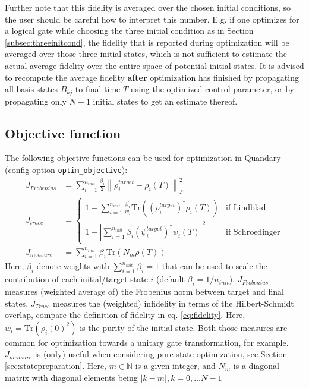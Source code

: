 \documentclass[11pt]{article}
\newcommand{\N}{\mathds{N}}
\begin{document}
Further note that this fidelity is averaged over the chosen initial conditions, so the user should be careful how to interpret this number. E.g. if one optimizes for a logical gate while choosing the three initial condition as in Section \ref{subsec:threeinitcond}, the fidelity that is reported during optimization will be averaged over those three initial states, which is not sufficient to estimate the actual average fidelity over the entire space of potential initial states. It is advised to recompute the average fidelity \textbf{after} optimization has finished by propagating all basis states $B_{kj}$ to final time $T$ using the optimized control parameter, or by propagating only $N+1$ initial states to get an estimate thereof.


\subsection{Objective function}\label{sec:objectivefunctionals}
The following objective functions can be used for optimization in Quandary (config option \texttt{optim\_objective}):
\begin{align}
 J_{Frobenius} &= \sum_{i=1}^{n_{init}} \frac{\beta_i}{2} \left\| \rho^{target}_i - \rho_i(T)\right\|^2_F \\ 
 J_{trace} &= 
\begin{cases} 
 1 - \sum_{i=1}^{n_{init}} \frac{\beta_i}{w_i} \mbox{Tr}\left((\rho^{target}_i)^\dagger\rho_i(T)\right) & \text{if Lindblad}\\
 1 - \left|\sum_{i=1}^{n_{init}} \beta_i (\psi^{target}_i)^\dagger\psi_i(T)\right|^2 & \text{if Schroedinger}
\end{cases}\\
 J_{measure} &= \sum_{i=1}^{n_{init}} \beta_i \mbox{Tr} \left( N_m \rho(T) \right) \label{eq:Jmeasure} 
\end{align}
Here, $\beta_i$ denote weights with $\sum_{i=1}^{n_{init}} \beta _i = 1$ that can be used to scale the contribution of each initial/target state $i$ (default $\beta_i = 1/n_{init}$). 
$J_{Frobenius}$ measures (weighted average of) the Frobenius norm between target and final states. $J_{Trace}$ measures the (weighted) infidelity in terms of the Hilbert-Schmidt overlap, compare the definition of fidelity in eq. \eqref{eq:fidelity}. Here, $w_i = \mbox{Tr}\left(\rho_i(0)^2\right)$ is the purity of the initial state. Both those measures are common for optimization towards a unitary gate transformation, for example. $J_{measure}$ is (only) useful when considering pure-state optimization, see Section \ref{sec:statepreparation}. Here, $m\in\N$ is a given integer, and $N_m$ is a diagonal matrix with diagonal elements being $|k-m|, k=0,\dots N-1$ 
\end{document}
